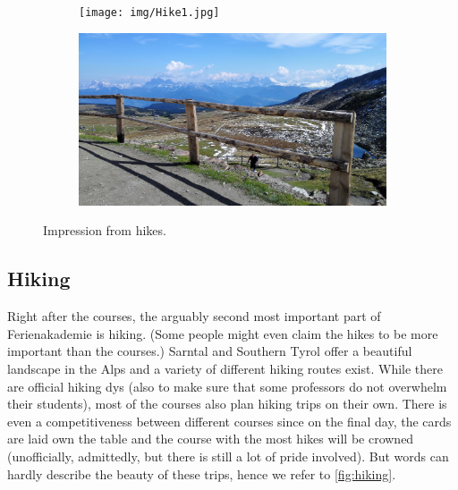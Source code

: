 \begin{figure}[ht]%
	\centering
    \begin{subfigure}[t]{0.5\textwidth}
 	\begin{center}%
 		\texttt{[image: img/Hike1.jpg]}%
 	\end{center}%
    \end{subfigure}%
    \begin{subfigure}[t]{0.5\textwidth}
 	\begin{center}%
 		\includegraphics[scale=0.05]{img/Hike2.jpg}%
 	\end{center}%
    \end{subfigure}
    \caption{Impression from hikes.}
    \label{fig:hiking}
\end{figure}
\subsection{Hiking}
Right after the courses, the arguably second most important part of Ferienakademie is hiking. (Some people might even claim the hikes to be more important than the courses.) Sarntal and Southern Tyrol offer a beautiful landscape in the Alps and a variety of different hiking routes exist. While there are official hiking dys (also to make sure that some professors do not overwhelm their students), most of the courses also plan hiking trips on their own. There is even a competitiveness between different courses since on the final day, the cards are laid own the table and the course with the most hikes will be crowned (unofficially, admittedly, but there is still a lot of pride involved). But words can hardly describe the beauty of these trips, hence we refer to \autoref{fig:hiking}.

